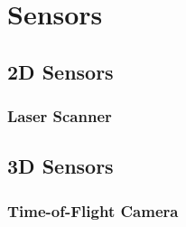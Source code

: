 

\chapter{Sensors}




\section{2D Sensors}

\subsection{Laser Scanner}





\section{3D Sensors}


\subsection{Time-of-Flight Camera}










